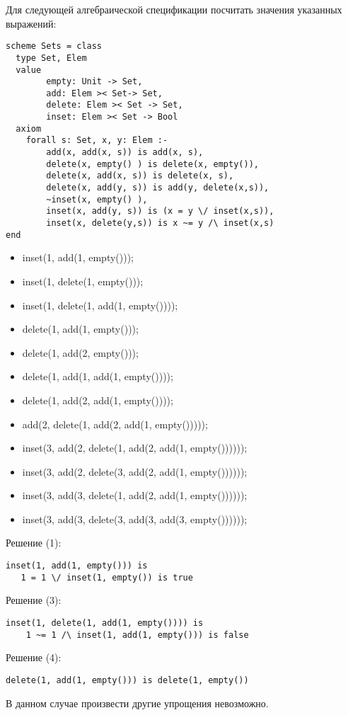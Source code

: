

\z Для следующей алгебраической спецификации посчитать значения указанных выражений:
\begin{lstlisting}
scheme Sets = class
  type Set, Elem
  value
        empty: Unit -> Set,
        add: Elem >< Set-> Set,
        delete: Elem >< Set -> Set,
        inset: Elem >< Set -> Bool
  axiom
    forall s: Set, x, y: Elem :-
        add(x, add(x, s)) is add(x, s),
        delete(x, empty() ) is delete(x, empty()),
        delete(x, add(x, s)) is delete(x, s),
        delete(x, add(y, s)) is add(y, delete(x,s)),
        ~inset(x, empty() ),
        inset(x, add(y, s)) is (x = y \/ inset(x,s)),
        inset(x, delete(y,s)) is x ~= y /\ inset(x,s)
end
\end{lstlisting}
\begin{itemize}
  \item inset(1, add(1, empty()));
  \item inset(1, delete(1, empty()));
  \item inset(1, delete(1, add(1, empty())));
  \item delete(1, add(1, empty()));
  \item delete(1, add(2, empty()));
  \item delete(1, add(1, add(1, empty())));
  \item delete(1, add(2, add(1, empty())));
  \item add(2, delete(1, add(2, add(1, empty()))));
  \item inset(3, add(2, delete(1, add(2, add(1, empty())))));
  \item inset(3, add(2, delete(3, add(2, add(1, empty())))));
  \item inset(3, add(3, delete(1, add(2, add(1, empty())))));
  \item inset(3, add(3, delete(3, add(3, add(3, empty())))));
\end{itemize}

Решение (1):
\begin{lstlisting}
inset(1, add(1, empty())) is
   1 = 1 \/ inset(1, empty()) is true
\end{lstlisting}

Решение (3):
\begin{lstlisting}
inset(1, delete(1, add(1, empty()))) is
    1 ~= 1 /\ inset(1, add(1, empty())) is false
\end{lstlisting}

Решение (4):
\begin{lstlisting}
delete(1, add(1, empty())) is delete(1, empty())
\end{lstlisting}
В данном случае произвести другие упрощения невозможно.

